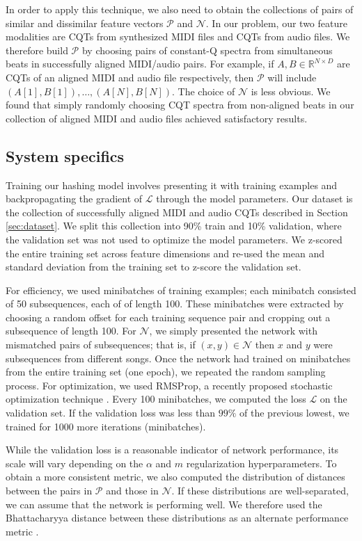 \documentclass{article}
\begin{document}
In order to apply this technique, we also need to obtain the collections of pairs of similar and dissimilar feature vectors $\mathcal{P}$ and $\mathcal{N}$.
In our problem, our two feature modalities are CQTs from synthesized MIDI files and CQTs from audio files.
We therefore build $\mathcal{P}$ by choosing pairs of constant-Q spectra from simultaneous beats in successfully aligned MIDI/audio pairs.
For example, if $A, B \in \mathbb{R}^{N \times D}$ are CQTs of an aligned MIDI and audio file respectively, then $\mathcal{P}$ will include $(A[1], B[1]), \ldots, (A[N], B[N])$.
The choice of $\mathcal{N}$ is less obvious.
We found that simply randomly choosing CQT spectra from non-aligned beats in our collection of aligned MIDI and audio files achieved satisfactory results.

\subsection{System specifics}

Training our hashing model involves presenting it with training examples and backpropagating the gradient of $\mathcal{L}$ through the model parameters.
Our dataset is the collection of successfully aligned MIDI and audio CQTs described in Section \ref{sec:dataset}.
We split this collection into 90\% train and 10\% validation, where the validation set was not used to optimize the model parameters.
We z-scored the entire training set across feature dimensions and re-used the mean and standard deviation from the training set to z-score the validation set.

For efficiency, we used minibatches of training examples; each minibatch consisted of 50 subsequences, each of of length 100.
These minibatches were extracted by choosing a random offset for each training sequence pair and cropping out a subsequence of length 100.
For $\mathcal{N}$, we simply presented the network with mismatched pairs of subsequences; that is, if $(x, y) \in \mathcal{N}$ then $x$ and $y$ were subsequences from different songs.
Once the network had trained on minibatches from the entire training set (one epoch), we repeated the random sampling process. 
For optimization, we used RMSProp, a recently proposed stochastic optimization technique \cite{tieleman2012lecture}.
Every 100 minibatches, we computed the loss $\mathcal{L}$ on the validation set.
If the validation loss was less than $99\%$ of the previous lowest, we trained for 1000 more iterations (minibatches).

While the validation loss is a reasonable indicator of network performance, its scale will vary depending on the $\alpha$ and $m$ regularization hyperparameters.
To obtain a more consistent metric, we also computed the distribution of distances between the pairs in $\mathcal{P}$ and those in $\mathcal{N}$.
If these distributions are well-separated, we can assume that the network is performing well.
We therefore used the Bhattacharyya distance between these distributions as an alternate performance metric \cite{bhattacharyya1943measure}.
\end{document}
